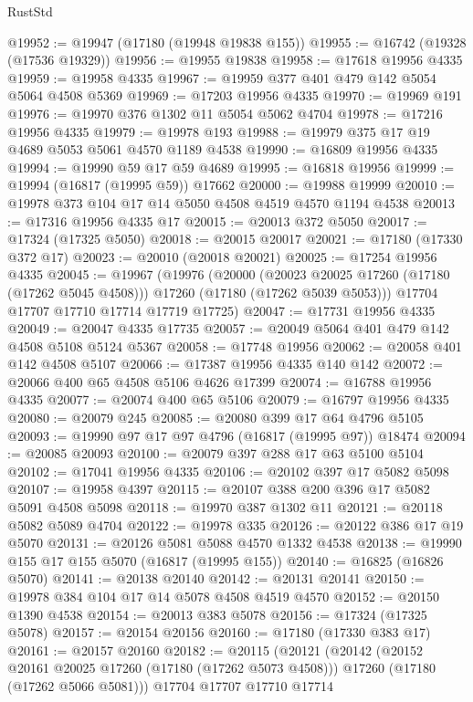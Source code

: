 \begin{lexlean}{RustStd}
\begin{coremodule}
{\begin{coremodule}
{{{{{{{{{{{{{{{{{{{{{{{{{{{{{{{{{{{{{{{{{{{{{{{{{{{{{{{@19952 := @19947 (@17180 (@19948 @19838 @155))
@19955 := @16742 (@19328 (@17536 @19329))
@19956 := @19955 @19838
@19958 := @17618 @19956 @4335
@19959 := @19958 @4335
@19967 := @19959 @377 @401 @479 @142 @5054 @5064 @4508 @5369
@19969 := @17203 @19956 @4335
@19970 := @19969 @191
@19976 := @19970 @376 @1302 @11 @5054 @5062 @4704
@19978 := @17216 @19956 @4335
@19979 := @19978 @193
@19988 := @19979 @375 @17 @19 @4689 @5053 @5061 @4570 @1189 @4538
@19990 := @16809 @19956 @4335
@19994 := @19990 @59 @17 @59 @4689
@19995 := @16818 @19956
@19999 := @19994 (@16817 (@19995 @59)) @17662
@20000 := @19988 @19999
@20010 := @19978 @373 @104 @17 @14 @5050 @4508 @4519 @4570 @1194 @4538
@20013 := @17316 @19956 @4335 @17
@20015 := @20013 @372 @5050
@20017 := @17324 (@17325 @5050)
@20018 := @20015 @20017
@20021 := @17180 (@17330 @372 @17)
@20023 := @20010 (@20018 @20021)
@20025 := @17254 @19956 @4335
@20045 := @19967
    (@19976
      (@20000
        (@20023 @20025 @17260 (@17180 (@17262 @5045 @4508)))
        @17260
        (@17180 (@17262 @5039 @5053)))
      @17704
      @17707
      @17710
      @17714
      @17719
      @17725)
@20047 := @17731 @19956 @4335
@20049 := @20047 @4335 @17735
@20057 := @20049 @5064 @401 @479 @142 @4508 @5108 @5124 @5367
@20058 := @17748 @19956
@20062 := @20058 @401 @142 @4508 @5107
@20066 := @17387 @19956 @4335 @140 @142
@20072 := @20066 @400 @65 @4508 @5106 @4626 @17399
@20074 := @16788 @19956 @4335
@20077 := @20074 @400 @65 @5106
@20079 := @16797 @19956 @4335
@20080 := @20079 @245
@20085 := @20080 @399 @17 @64 @4796 @5105
@20093 := @19990 @97 @17 @97 @4796 (@16817 (@19995 @97)) @18474
@20094 := @20085 @20093
@20100 := @20079 @397 @288 @17 @63 @5100 @5104
@20102 := @17041 @19956 @4335
@20106 := @20102 @397 @17 @5082 @5098
@20107 := @19958 @4397
@20115 := @20107 @388 @200 @396 @17 @5082 @5091 @4508 @5098
@20118 := @19970 @387 @1302 @11
@20121 := @20118 @5082 @5089 @4704
@20122 := @19978 @335
@20126 := @20122 @386 @17 @19 @5070
@20131 := @20126 @5081 @5088 @4570 @1332 @4538
@20138 := @19990 @155 @17 @155 @5070 (@16817 (@19995 @155))
@20140 := @16825 (@16826 @5070)
@20141 := @20138 @20140
@20142 := @20131 @20141
@20150 := @19978 @384 @104 @17 @14 @5078 @4508 @4519 @4570
@20152 := @20150 @1390 @4538
@20154 := @20013 @383 @5078
@20156 := @17324 (@17325 @5078)
@20157 := @20154 @20156
@20160 := @17180 (@17330 @383 @17)
@20161 := @20157 @20160
@20182 := @20115
    (@20121
      (@20142
        (@20152 @20161 @20025 @17260 (@17180 (@17262 @5073 @4508)))
        @17260
        (@17180 (@17262 @5066 @5081)))
      @17704
      @17707
      @17710
      @17714
}}}}}}}}}}}}}}}}}}}}}}}}}}}}}}}}}}}}}}}}}}}}}}}}}}}}}}}
\end{coremodule}}
\end{coremodule}
\end{lexlean}
